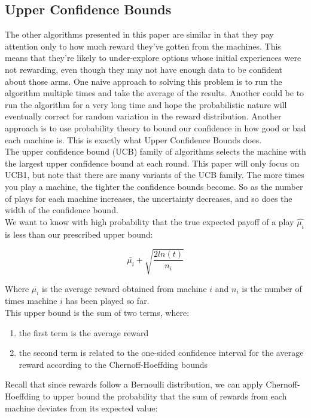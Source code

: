 \documentclass{article}
\begin{document}
\subsection{Upper Confidence Bounds}

The other algorithms presented in this paper are similar in that they pay attention only to how much reward they’ve gotten from the machines. This means that they're likely to under-explore options whose initial experiences were not rewarding, even though they may not have enough data to be confident about those arms. One naive approach to solving this problem is to run the algorithm multiple times and take the average of the results. Another could be to run the algorithm for a very long time and hope the probabilistic nature will eventually correct for random variation in the reward distribution. Another approach is to use probability theory to bound our confidence in how good or bad each machine is. This is exactly what Upper Confidence Bounds does.\\

The upper confidence bound (UCB) family of algorithms selects the machine with the largest upper confidence bound at each round. This paper will only focus on UCB1, but note that there are many variants of the UCB family. The more times you play a machine, the tighter the confidence bounds become. So as the number of plays for each machine increases, the uncertainty decreases, and so does the width of the confidence bound.\\

We want to know with high probability that the true expected payoff of a play $\hat{\mu_i}$ is less than our prescribed upper bound:

$$\bar{\mu_{i}} + \sqrt{\frac{2 ln (t)}{n_i}}$$

Where $\bar{\mu_{i}}$ is the average reward obtained from machine $i$ and $n_i$ is the number of times machine $i$ has been played so far.\\

This upper bound is the sum of two terms, where:

\begin{enumerate}
\item the first term is the average reward
\item the second term is related to the one-sided confidence interval for the average reward according to the Chernoff-Hoeffding bounds
\end{enumerate}

Recall that since rewards follow a Bernoulli distribution, we can apply Chernoff-Hoeffding to upper bound the probability that the sum of rewards from each machine deviates from its expected value:
\end{document}

